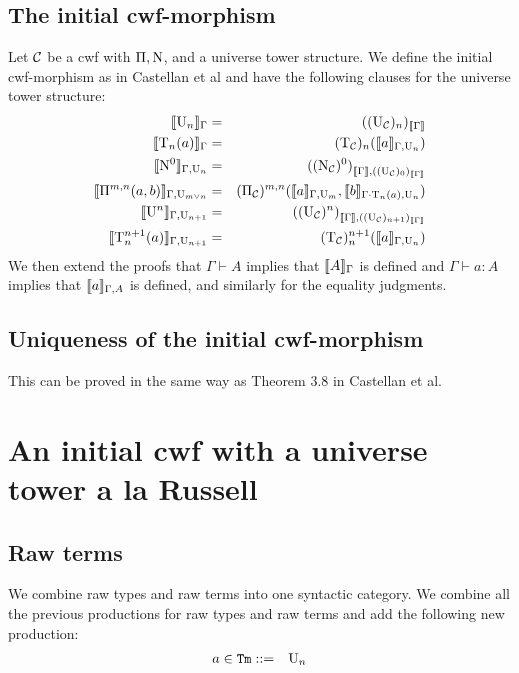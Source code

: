 \documentclass{lmcs}
\newcommand{\Ta}{\mathrm{T}}
\newcommand{\Tan}{\Ta_n}
\newcommand{\Un}{\U_n}
\newcommand{\UC}{\U_\C}
\newcommand{\NC}{\N_\C}
\newcommand{\PiC}{\Pi_\C}
\begin{document}
\subsection{The initial cwf-morphism} Let ${\mathcal C}$ be a cwf with $\Pi, \mathrm{N}$, and a universe tower structure. We define the initial cwf-morphism as in Castellan et al and have the following clauses for the universe tower structure:
\begin{eqnarray*}
\inte{\Un}_\Gamma &=& ((\UC)_n)_{\inte{\Gamma}}\\
\inte{\Tan(a)}_\Gamma &= & (\Ta_\C)_n(\inte{a}_{\Gamma,\Un})\\
\inte{\N^0}_{\Gamma,\Un} &=&  {({({\NC})^0})}_{\inte{\Gamma},((\UC)_0)_{\inte{\Gamma}}}\\
\inte{\Pi^{m,n}(a,b)}_{\Gamma,\U_{m \vee n}} &=&  (\PiC)^{m,n}(\inte{a}_{\Gamma,\U_m},\inte{b}_{\Gamma \cdot \Tan(a),\Un})\\
\inte{\U^n}_{\Gamma,\U_{n+1}} &=&  {({({\UC})^n})}_{\inte{\Gamma},((\UC)_{n+1})_{\inte{\Gamma}}}\\
\inte{\Ta^{n+1}_n(a)}_{\Gamma,\U_{n+1}} &= & (\Ta_\C)^{n+1}_n(\inte{a}_{\Gamma,\Un})
\end{eqnarray*}
We then extend the proofs that $\Gamma \vdash A$ implies that $\llbracket A \rrbracket_\Gamma$ is defined and $\Gamma \vdash a : A$ implies that $\llbracket a \rrbracket_{\Gamma,A}$ is defined, and similarly for the equality judgments. 

\subsection{Uniqueness of the initial cwf-morphism} This can be proved in the same way as Theorem 3.8 in Castellan et al.

\section{An initial cwf with a universe tower a la Russell}

\subsection{Raw terms}

We combine raw types and raw terms into one syntactic category.
We combine all the previous productions for raw types and raw terms and add the following new production:
\begin{eqnarray*}
a \in \RawTm &::=&  \Un
\end{eqnarray*}
\end{document}
